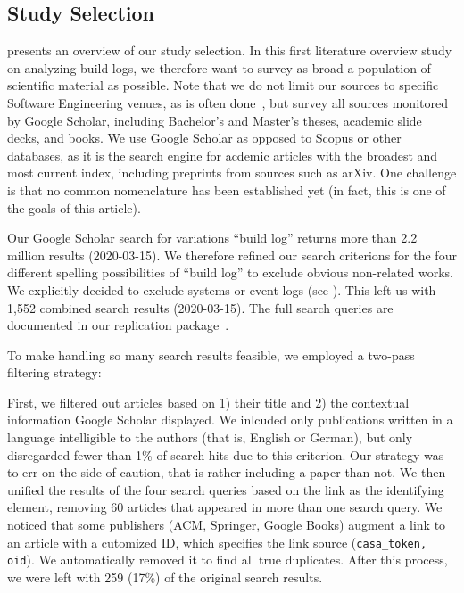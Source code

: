 \subsection{Study Selection}
 presents an overview of our study selection.
In this first literature overview study on analyzing build logs, we
therefore want to survey as broad a population of scientific material
as possible.
Note that we do not limit our sources to specific
Software Engineering venues, as is often
done~\cite{petersen2015guidelines}, but survey all sources
monitored by Google Scholar, including Bachelor's and Master's theses,
academic slide decks, and books.
We use Google Scholar as opposed to
Scopus or other databases, as it is the search engine for acdemic
articles with the broadest and most current index, including preprints
from sources such as arXiv.
One challenge is that no common
nomenclature has been established yet (in fact, this is one of the
goals of this article).

Our Google Scholar
search for variations ``build log'' returns more than 2.2 million results
(2020-03-15).
We therefore refined our search criterions for the four
different spelling possibilities of ``build log'' to exclude obvious
non-related works.
We explicitly decided to exclude systems
or event logs (see ).
This left us with 1,552 combined search results
(2020-03-15).
The full search queries are documented in our replication
package~\cite{brandt2020chunk-replication}.

To make handling so many search results feasible, we employed a
two-pass filtering strategy:

First, we filtered out articles based on 1) their title and 2) the
contextual information Google Scholar displayed.
We inlcuded only
publications written in a language intelligible to the authors (that
is, English or German), but only disregarded fewer than 1\% of search
hits due to this criterion.
Our strategy was to err on the side of
caution, that is rather including a paper than not.
We then unified
the results of the four search queries based on the link as the
identifying element, removing 60 articles that appeared in more than
one search query.
We noticed that some publishers (ACM, Springer,
Google Books) augment a link to an article with a cutomized ID, which
specifies the link source ({\tt casa\_token, oid}).
We automatically
removed it to find all true duplicates.
After this process, we were
left with 259 (17\%) of the original search results.

